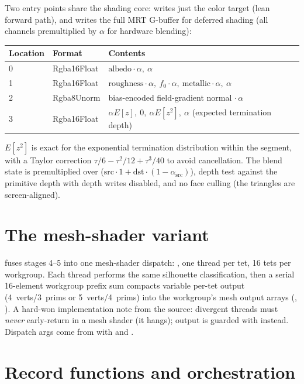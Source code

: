 Two entry points share the shading core:  writes just
the color target (lean forward path), and  writes the full MRT
G-buffer for deferred shading (all channels premultiplied by $\alpha$ for
hardware blending):

\begin{longtable}{@{}lll@{}}
\toprule
Location & Format & Contents \\
\midrule
0 & Rgba16Float & $\text{albedo}\cdot\alpha,\ \alpha$ \\
1 & Rgba16Float & $\text{roughness}\cdot\alpha,\ f_{0}\cdot\alpha,\ \text{metallic}\cdot\alpha,\ \alpha$ \\
2 & Rgba8Unorm & bias-encoded field-gradient normal $\cdot\,\alpha$ \\
3 & Rgba16Float & $\alpha E[z],\ 0,\ \alpha E[z^2],\ \alpha$ (expected termination depth) \\
\bottomrule
\end{longtable}

$E[z^2]$ is exact for the exponential termination distribution within the
segment, with a Taylor correction
$\tau/6 - \tau^2/12 + \tau^3/40$ to avoid cancellation. The blend state is
premultiplied over ($\text{src}\cdot 1 + \text{dst}\cdot(1-\alpha_\text{src})$),
depth test  against the primitive depth with depth writes
disabled, and no face culling (the triangles are screen-aligned).

\section{The mesh-shader variant}

 fuses stages 4--5 into one mesh-shader dispatch:
, one thread per tet, 16 tets per workgroup. Each
thread performs the same silhouette classification, then a serial 16-element
workgroup prefix sum compacts variable per-tet output (4~verts/3~prims or
5~verts/4~prims) into the workgroup's mesh output arrays
(, ). A hard-won implementation note
from the source: divergent threads must \emph{never} early-return in a mesh
shader (it hangs); output is guarded with 
instead. Dispatch args come from  with
 and .

\section{Record functions and orchestration}

